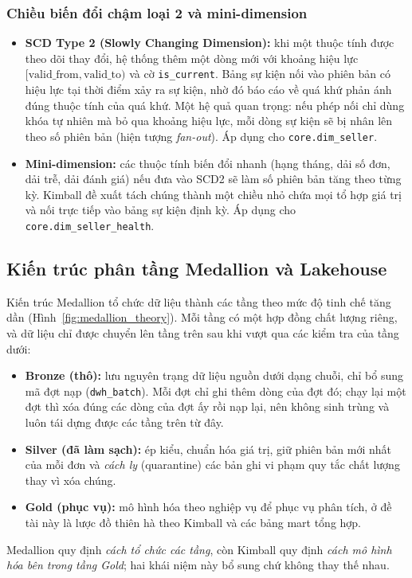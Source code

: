 \subsubsection*{Chiều biến đổi chậm loại 2 và mini-dimension}
\begin{itemize}
    \item \textbf{SCD Type 2 (Slowly Changing Dimension):} khi một thuộc tính được theo dõi thay đổi, hệ thống thêm một dòng mới với khoảng hiệu lực $[\text{valid\_from}, \text{valid\_to})$ và cờ \texttt{is\_current}. Bảng sự kiện nối vào phiên bản có hiệu lực tại thời điểm xảy ra sự kiện, nhờ đó báo cáo về quá khứ phản ánh đúng thuộc tính của quá khứ. Một hệ quả quan trọng: nếu phép nối chỉ dùng khóa tự nhiên mà bỏ qua khoảng hiệu lực, mỗi dòng sự kiện sẽ bị nhân lên theo số phiên bản (hiện tượng \emph{fan-out}). Áp dụng cho \texttt{core.dim\_seller}.
    \item \textbf{Mini-dimension:} các thuộc tính biến đổi nhanh (hạng tháng, dải số đơn, dải trễ, dải đánh giá) nếu đưa vào SCD2 sẽ làm số phiên bản tăng theo từng kỳ. Kimball đề xuất tách chúng thành một chiều nhỏ chứa mọi tổ hợp giá trị và nối trực tiếp vào bảng sự kiện định kỳ. Áp dụng cho \texttt{core.dim\_seller\_health}.
\end{itemize}

\subsection{Kiến trúc phân tầng Medallion và Lakehouse}
Kiến trúc Medallion tổ chức dữ liệu thành các tầng theo mức độ tinh chế tăng dần (Hình~\ref{fig:medallion_theory}). Mỗi tầng có một hợp đồng chất lượng riêng, và dữ liệu chỉ được chuyển lên tầng trên sau khi vượt qua các kiểm tra của tầng dưới:
\begin{itemize}
    \item \textbf{Bronze (thô):} lưu nguyên trạng dữ liệu nguồn dưới dạng chuỗi, chỉ bổ sung mã đợt nạp (\texttt{dwh\_batch}). Mỗi đợt chỉ ghi thêm dòng của đợt đó; chạy lại một đợt thì xóa đúng các dòng của đợt ấy rồi nạp lại, nên không sinh trùng và luôn tái dựng được các tầng trên từ đây.
    \item \textbf{Silver (đã làm sạch):} ép kiểu, chuẩn hóa giá trị, giữ phiên bản mới nhất của mỗi đơn và \emph{cách ly} (quarantine) các bản ghi vi phạm quy tắc chất lượng thay vì xóa chúng.
    \item \textbf{Gold (phục vụ):} mô hình hóa theo nghiệp vụ để phục vụ phân tích, ở đề tài này là lược đồ thiên hà theo Kimball và các bảng mart tổng hợp.
\end{itemize}
Medallion quy định \emph{cách tổ chức các tầng}, còn Kimball quy định \emph{cách mô hình hóa bên trong tầng Gold}; hai khái niệm này bổ sung chứ không thay thế nhau.

